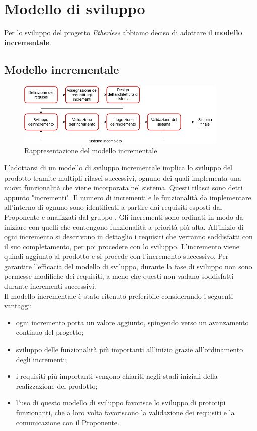 \section{Modello di sviluppo}
Per lo sviluppo del progetto \textit{Etherless} abbiamo deciso di adottare il \textbf{modello incrementale}.

	\subsection{Modello incrementale}
	\begin{figure}[h!]
		\centering
		\includegraphics[width=0.9\textwidth]{./res/img/modello_incr.png}
		\caption{Rappresentazione del modello incrementale}
	\end{figure}

	L'adottarsi di un modello di sviluppo incrementale implica lo sviluppo del prodotto tramite multipli rilasci successivi, ognuno dei quali implementa una nuova funzionalità che viene incorporata nel sistema. Questi rilasci sono detti appunto "incrementi". Il numero di incrementi e le funzionalità da implementare all'interno di ognuno sono identificati a partire dai requisiti esposti dal Proponente e analizzati dal gruppo \Gruppo{}. Gli incrementi sono ordinati in modo da iniziare con quelli che contengono funzionalità a priorità più alta. All'inizio di ogni incremento si descrivono in dettaglio i requisiti che verranno soddisfatti con il suo completamento, per poi procedere con lo sviluppo. L'incremento viene quindi aggiunto al prodotto e si procede con l'incremento successivo. Per garantire l'efficacia del modello di sviluppo, durante la fase di sviluppo non sono permesse modifiche dei requisiti, a meno che questi non vadano soddisfatti durante incrementi successivi.\\
	Il modello incrementale è stato ritenuto preferibile considerando i seguenti vantaggi:

	\begin{itemize}
		\item ogni incremento porta un valore aggiunto, spingendo verso un avanzamento continuo del progetto;
		\item sviluppo delle funzionalità più importanti all'inizio grazie all'ordinamento degli incrementi;
		\item i requisiti più importanti vengono chiariti negli stadi iniziali della realizzazione del prodotto;
		\item l'uso di questo modello di sviluppo favorisce lo sviluppo di prototipi funzionanti, che a loro volta favoriscono la validazione dei requisiti e la comunicazione con il Proponente.
	\end{itemize}

